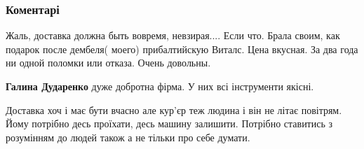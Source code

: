  
 
 
 
 
\subsubsection{Коментарі}
\label{sec:27_07_2021.fb.birjukov_jurij.1.benzopila_cerkov_rozetka.cmt}

\begin{itemize}
 
Жаль, доставка должна быть вовремя, невзирая.... Если что. Брала своим, как подарок после дембеля( моего) прибалтийскую Виталс. Цена вкусная. За два года ни одной поломки или отказа. Очень довольны.


\begin{itemize}
 
\textbf{Галина Дударенко} дуже добротна фірма. У них всі інструменти якісні.

 
Доставка хоч і має бути вчасно але кур'єр теж людина і він не літає повітрям. Йому потрібно десь проїхати, десь машину залишити. Потрібно ставитись з розумінням до людей також а не тільки про себе думати.

 

\end{itemize}
\end{itemize}

